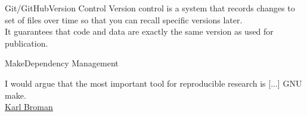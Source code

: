 \documentclass[12pt,t]{beamer}
\begin{document}
{{
  \begin{frame}[plain]
  \end{frame}
}
{
  \begin{frame}[plain]
  \end{frame}
}
\begin{frame}[c]{Git/GitHub\textemdash{}Version Control}
  Version control is a system that records changes to set of files
  over time so that you can recall specific versions later.\\
  \vspace{10mm}
  It guarantees that code and data are exactly the same version as used for
  publication.
\end{frame}
\begin{frame}[c]{Make\textemdash{}Dependency Management}

I would argue that the most important tool for reproducible research is [...] GNU make.\\
\hfill {\textendash} \href{https://kbroman.org/minimal_make/}{Karl Broman}\\


\end{frame}}
\end{document}
